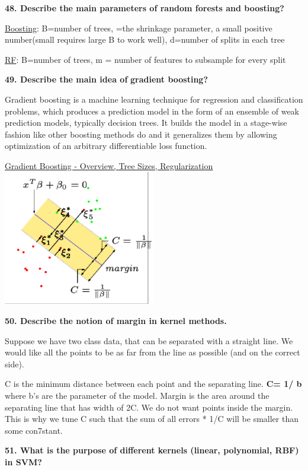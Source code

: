 \textbf{48. Describe the main parameters of random forests and
boosting?}

\underline{Boosting}: B=number of trees, \textcrlambda=the shrinkage parameter, a
small positive number(small \textcrlambda requires large B to work well), d=number
of splits in each tree

\underline{RF}: B=number of trees, m = number of features to subsample
for every split

\textbf{49. Describe the main idea of} \textbf{gradient boosting?}

Gradient boosting is a machine learning technique for regression and
classification problems, which produces a prediction model in the form
of an ensemble of weak prediction models, typically decision trees. It
builds the model in a stage-wise fashion like other boosting methods do
and it generalizes them by allowing optimization of an arbitrary
differentiable loss function.

\href{https://corporatefinanceinstitute.com/resources/knowledge/other/gradient-boosting/}{\underline{Gradient
Boosting - Overview, Tree Sizes,
Regularization}}\includegraphics[width=2.60938in,height=2.32109in]{media/image33.png}

\textbf{50. Describe the notion of margin in kernel methods.}

Suppose we have two class data, that can be separated with a straight
line. We would like all the points to be as far from the line as
possible (and on the correct side).

C is the minimum distance between each point and the separating line.
\textbf{C= 1/ \textbar b\textbar{}} where b's are the parameter of the
model. Margin is the area around the separating line that has width of
2C. We do not want points inside the margin. This is why we tune C such
that the sum of all errors * 1/C will be smaller than some con7stant.

\textbf{51. What is the purpose of different kernels (linear,
polynomial, RBF) in SVM?}

